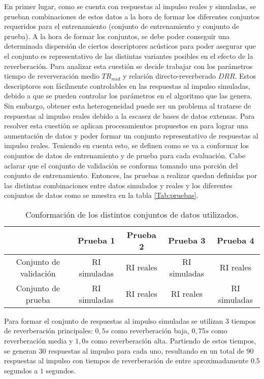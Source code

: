 En primer lugar, como se cuenta con respuestas al impulso reales y simuladas, se prueban combinaciones de estos datos a la hora de formar los diferentes conjuntos requeridos para el entrenamiento (conjunto de entrenamiento y conjunto de prueba). A la hora de formar los conjuntos, se debe poder conseguir una determinada dispersión de ciertos descriptores acústicos para poder asegurar que el conjunto es representativo de las distintas variantes posibles en el efecto de la reverberación. Para analizar esta cuestión se decide trabajar con los parámetros tiempo de reververación medio $TR_{mid}$ y relación directo-reverberado $DRR$. Estos descriptores son fácilmente controlables en las respuestas al impulso simuladas, debido a que se pueden controlar los parámetros en el algoritmo que las genera. Sin embargo, obtener esta heterogeneidad puede ser un problema al tratarse de respuestas al impulso reales debido a la escasez de bases de datos extensas. Para resolver esta cuestión se aplican procesamientos propuestos en \cite{aumentacion} para lograr una aumentación de datos y poder formar un conjunto representativo de respuestas al impulso reales. 
Teniendo en cuenta esto, se definen como se va a conformar los conjuntos de datos de entrenamiento y de prueba para cada evaluación. Cabe aclarar que el conjunto de validación se conforma tomando una porción del conjunto de entrenamiento. Entonces, las pruebas a realizar quedan definidas por las distintas combinaciones entre datos simulados y reales y los diferentes conjuntos de datos como se muestra en la tabla \ref{Tab:pruebas}. 

\begin{table}[]
\caption{Conformación de los distintos conjuntos de datos utilizados.}
\centering
\label{tab:pruebas}
\begin{tabular}{c|c|c|c|c}
                       & Prueba 1     & Prueba 2  & Prueba 3     & Prueba 4     \\ \hline
Conjunto de validación & RI simuladas & RI reales & RI simuladas & RI reales    \\
Conjunto de prueba     & RI simuladas & RI reales & RI reales    & RI simuladas
\end{tabular}
\end{table}

Para formar el conjunto de respuestas al impulso simuladas se utilizan 3 tiempos de reverberación principales: $0,5 s$ como reverberación baja, $0,75 s$ como reverberación media y $1,0 s$ como reverberación alta. Partiendo de estos tiempos, se generan 30 respuestas al impulso para cada uno, resultando en un total de 90 respuestas al impulso con tiempos de reverberación de entre aproximadamente $0.5$ segundos a $1$ segundos. 

